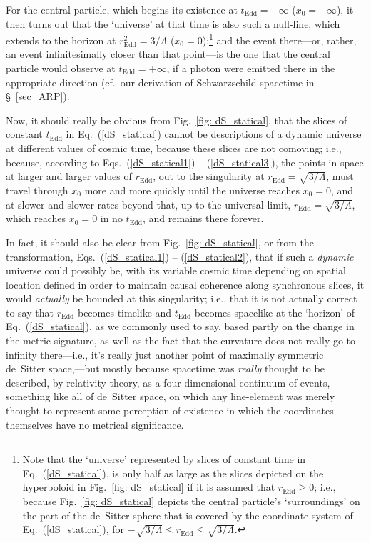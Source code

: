 For the central particle, which begins its existence at $t_{\mathrm{Edd}}=-\infty$ ($x_0=-\infty$), it then turns out that the `universe' at that time is also such a null-line, which extends to the horizon at $r_{\mathrm{Edd}}^2=3/\Lambda$ ($x_0=0$);\footnote{Note that the `universe' represented by slices of constant time in Eq.~(\ref{dS_statical}), is only half as large as the slices depicted on the hyperboloid in Fig.~\ref{fig: dS_statical} if it is assumed that $r_{\mathrm{Edd}}\geq0$; i.e., because Fig.~\ref{fig: dS_statical} depicts the central particle's `surroundings' on the part of the de~Sitter sphere that is covered by the coordinate system of Eq.~(\ref{dS_statical}), for $-\sqrt{3/\Lambda}\leq{r_{\mathrm{Edd}}}\leq\sqrt{3/\Lambda}$.} and the event there---or, rather, an event infinitesimally closer than that point---is the one that the central particle would observe at $t_{\mathrm{Edd}}=+\infty$, if a photon were emitted there in the appropriate direction (cf.~our derivation of Schwarzschild spacetime in \S~\ref{sec_ARP}).

Now, it should really be obvious from Fig.~\ref{fig: dS_statical}, that the slices of constant $t_{\mathrm{Edd}}$ in Eq.~(\ref{dS_statical}) cannot be descriptions of a dynamic universe at different values of cosmic time, because  these slices are not comoving; i.e., because, according to Eqs.~(\ref{dS_statical1}) -- (\ref{dS_statical3}), the points in space at larger and larger values of $r_{\mathrm{Edd}}$, out to the singularity at $r_{\mathrm{Edd}}=\sqrt{3/\Lambda}$, must travel through $x_0$ more and more quickly until the universe reaches $x_0=0$, and at slower and slower rates beyond that, up to the universal limit, $r_{\mathrm{Edd}}=\sqrt{3/\Lambda}$, which reaches $x_0=0$ in no $t_{\mathrm{Edd}}$, and remains there forever.

In fact, it should also be clear from Fig.~\ref{fig: dS_statical}, or from the transformation, Eqs.~(\ref{dS_statical1}) -- (\ref{dS_statical2}), that if such a \textit{dynamic} universe could possibly be, with its variable cosmic time depending on spatial location defined in order to maintain causal coherence along synchronous slices, it would \textit{actually} be bounded at this singularity; i.e., that it is not actually correct to say that $r_{\mathrm{Edd}}$ becomes timelike and $t_{\mathrm{Edd}}$ becomes spacelike at the `horizon' of Eq.~(\ref{dS_statical}), as we commonly used to say, based partly on the change in the metric signature, as well as the fact that the curvature does not really go to infinity there---i.e., it's really just another point of maximally symmetric de~Sitter space,---but mostly because spacetime was \textit{really} thought to be described, by relativity theory, as a four-dimensional continuum of events, something like all of de~Sitter space, on which any line-element was merely thought to represent some perception of existence in which the coordinates themselves have no metrical significance.

